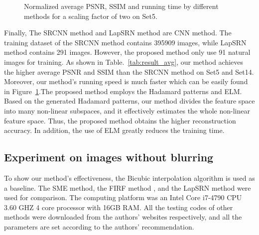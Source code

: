 \documentclass[review,numbers,sort&compress]{elsarticle}  %
\begin{document}
\begin{figure}[tb]
\caption{Normalized average PSNR, SSIM and running time by different methods for a scaling factor of two on Set5.}
\label{fig:barchart1}
\end{figure}

Finally, The SRCNN method and LapSRN method are CNN method. The training dataset of the SRCNN method contains 395909 images, while LapSRN method contains 291 images. However, the proposed method only use 91 natural images for training. As shown in Table.~\ref{tab:result_avg}, our method achieves the higher average PSNR and SSIM than the SRCNN method on Set5 and Set14. Moreover, our method’s running speed is much faster which can be easily found in Figure~\ref{fig:barchart1}.The proposed method employs the Hadamard patterns and ELM. Based on the generated Hadamard patterns, our method divides the feature space into many non-linear subspaces, and it effectively estimates the whole non-linear feature space. Thus, the proposed method obtains the higher reconstruction accuracy. In addition, the use of ELM greatly reduces the training time.

\subsection{Experiment on images without blurring}
To show our method’s effectiveness, the Bicubic interpolation algorithm is used as a baseline. The SME method\cite{mallat2010super}, the FIRF method \cite{huang2015fast}, and the LapSRN method \cite{lai2017deep} were used for comparison. The computing platform was an Intel Core i7-4790 CPU 3.60 GHZ 4 core processor with 16GB RAM. All the testing codes of other methods were downloaded from the authors’ websites respectively, and all the parameters are set according to the authors’ recommendation.
\end{document}
